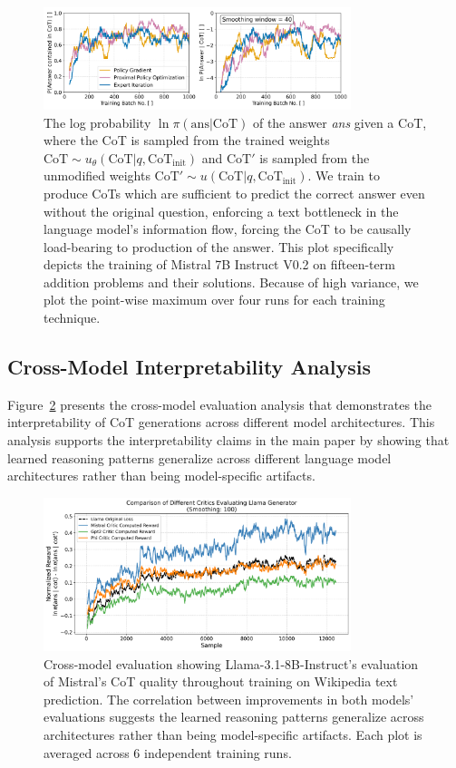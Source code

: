 \documentclass{article}
\begin{document}
\begin{figure}[ht]
    \centering
    \includegraphics[width=0.8\textwidth]{Figures/cot_performance_comparison.png}
    \caption{The log probability $\ln \pi(\text{ans} | \text{CoT})$ of the answer \textit{ans} given a CoT, where the CoT is sampled from the trained weights $\text{CoT} \sim u_\theta(\text{CoT} | q, \text{CoT}_{\text{init}})$ and $\text{CoT}'$ is sampled from the unmodified weights $\text{CoT}' \sim u(\text{CoT} | q, \text{CoT}_{\text{init}})$. We train to produce CoTs which are sufficient to predict the correct answer even without the original question, enforcing a text bottleneck in the language model's information flow, forcing the CoT to be causally load-bearing to production of the answer. This plot specifically depicts the training of Mistral 7B Instruct V0.2 on fifteen-term addition problems and their solutions. Because of high variance, we plot the point-wise maximum over four runs for each training technique.}
    \label{fig:cot_arithmetic_performance}
\end{figure}

\subsection{Cross-Model Interpretability Analysis}
Figure~\ref{fig:wiki_cross_model} presents the cross-model evaluation analysis that demonstrates the interpretability of CoT generations across different model architectures. This analysis supports the interpretability claims in the main paper by showing that learned reasoning patterns generalize across different language model architectures rather than being model-specific artifacts.

\begin{figure}[ht]
    \centering
    \includegraphics[width=0.8\textwidth]{Figures/wiki_multi_critic_comparison.png}
    \caption{Cross-model evaluation showing Llama-3.1-8B-Instruct's evaluation of Mistral's CoT quality throughout training on Wikipedia text prediction. The correlation between improvements in both models' evaluations suggests the learned reasoning patterns generalize across architectures rather than being model-specific artifacts. Each plot is averaged across 6 independent training runs.}
    \label{fig:wiki_cross_model}
\end{figure}
\end{document}
